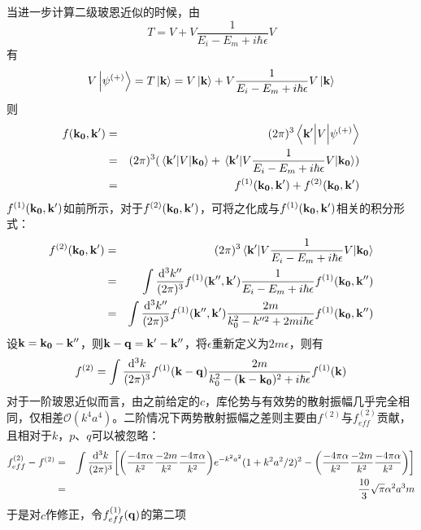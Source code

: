 \documentclass[hyperref,cs4size,titlepage,twoside]{ctexart}
\begin{document}
当进一步计算二级玻恩近似的时候，由
\begin{equation}
  T=V+V\frac{1}{E_i-E_m+i\hbar\epsilon}V
\end{equation}
有
\begin{equation}
  V\ket{\psi^{(+)}}=T\ket{\vb{k}}=V\ket{\vb{k}}+V\frac{1}{E_i-E_m+i\hbar\epsilon}V\ket{\vb{k}}
\end{equation}
则
\begin{eqnarray}
  f(\vb{k_0},\vb{k'}) &=& (2\pi)^3\mel{\vb{k'}}{V}{\psi^{(+)}}\\
   &=& (2\pi)^3(\mel{\vb{k'}}{V}{\vb{k_0}}+\mel{\vb{k'}}{V\frac{1}{E_i-E_m+i\hbar\epsilon}V}{\vb{k_0}}) \\
   &=& f^{(1)}(\vb{k_0},\vb{k'})+f^{(2)}(\vb{k_0},\vb{k'})
\end{eqnarray}
$f^{(1)}(\vb{k_0},\vb{k'})$如前所示，对于$f^{(2)}(\vb{k_0},\vb{k'})$，可将之化成与$f^{(1)}(\vb{k_0},\vb{k'})$相关的积分形式：
\begin{eqnarray}
  f^{(2)}(\vb{k_0},\vb{k'})&=&(2\pi)^3\mel{\vb{k'}}{V\frac{1}{E_i-E_m+i\hbar\epsilon}V}{\vb{k_0}} \\
  &=&\int\frac{\dd^3k''}{(2\pi)^3}f^{(1)}(\vb{k''},\vb{k'})\frac{1}{E_i-E_m+i\hbar\epsilon}f^{(1)}(\vb{k_0},\vb{k''})\\
  &=&\int\frac{\dd^3k''}{(2\pi)^3}f^{(1)}(\vb{k''},\vb{k'})\frac{2m}{k_0^2-k''^2+2mi\hbar\epsilon}f^{(1)}(\vb{k_0},\vb{k''})
\end{eqnarray}
设$\vb{k}=\vb{k_0}-\vb{k''}$，则$\vb{k}-\vb{q}=\vb{k'}-\vb{k''}$，将$\epsilon$重新定义为$2m\epsilon$，则有
\begin{equation}
  f^{(2)}=\int\frac{\dd^3k}{(2\pi)^3}f^{(1)}(\vb{k}-\vb{q})\frac{2m}{k_0^2-(\vb{k}-\vb{k_0})^2+i\hbar\epsilon}f^{(1)}(\vb{k})
\end{equation}
对于一阶玻恩近似而言，由之前给定的$c$，库伦势与有效势的散射振幅几乎完全相同，仅相差$\mathcal{O}(k^4a^4)$。二阶情况下两势散射振幅之差则主要由$f^{(2)}$与$f_{eff}^{(2)}$贡献，且相对于$k$，$p$、$q$可以被忽略：
\begin{eqnarray}
  f_{eff}^{(2)}-f^{(2)} &=& \int\frac{\dd^3k}{(2\pi)^3}\bqty{\pqty{\frac{-4\pi\alpha}{k^2}\frac{-2m}{k^2}\frac{-4\pi\alpha}{k^2}}e^{-k^2a^2}(1+k^2a^2/2)^2-\pqty{\frac{-4\pi\alpha}{k^2}\frac{-2m}{k^2}\frac{-4\pi\alpha}{k^2}}} \\
   &=& \frac{10}{3} \sqrt{\pi } \alpha^2  a^3 m
\end{eqnarray}
于是对$c$作修正，令$f_{eff}^{(1)}(\vb{q})$的第二项
\end{document}
